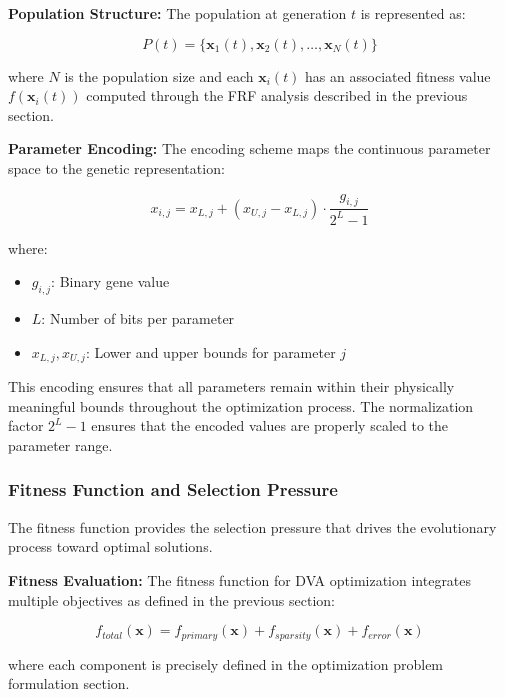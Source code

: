 \documentclass[12pt,a4paper]{article}
\begin{document}
\textbf{Population Structure:} The population at generation $t$ is represented as:

\begin{equation}\label{Eq.population_structure}
P(t) = \{\mathbf{x}_1(t), \mathbf{x}_2(t), \ldots, \mathbf{x}_N(t)\}
\end{equation}

where $N$ is the population size and each $\mathbf{x}_i(t)$ has an associated fitness value $f(\mathbf{x}_i(t))$ computed through the FRF analysis described in the previous section.

\textbf{Parameter Encoding:} The encoding scheme maps the continuous parameter space to the genetic representation:

\begin{equation}\label{Eq.parameter_encoding}
x_{i,j} = x_{L,j} + (x_{U,j} - x_{L,j}) \cdot \frac{g_{i,j}}{2^L - 1}
\end{equation}

where:
\begin{itemize}
    \item $g_{i,j}$: Binary gene value
    \item $L$: Number of bits per parameter
    \item $x_{L,j}, x_{U,j}$: Lower and upper bounds for parameter $j$
\end{itemize}

This encoding ensures that all parameters remain within their physically meaningful bounds throughout the optimization process. The normalization factor $2^L - 1$ ensures that the encoded values are properly scaled to the parameter range.

\subsubsection{Fitness Function and Selection Pressure}

The fitness function provides the selection pressure that drives the evolutionary process toward optimal solutions.

\textbf{Fitness Evaluation:} The fitness function for DVA optimization integrates multiple objectives as defined in the previous section:

\begin{equation}\label{Eq.fitness_evaluation}
f_{total}(\mathbf{x}) = f_{primary}(\mathbf{x}) + f_{sparsity}(\mathbf{x}) + f_{error}(\mathbf{x})
\end{equation}

where each component is precisely defined in the optimization problem formulation section.
\end{document}
